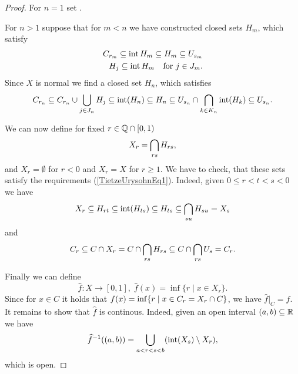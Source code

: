 \begin{proof}
	For $n=1$ set .

	For $n>1$ suppose that for $m<n$ we have constructed closed sets $H_m$, which satisfy
	\begin{align*}
		C_{r_m} \subseteq \operatorname{int} H_m \subseteq H_m \subseteq U_{s_m}\\
		H_j \subseteq \operatorname{int} H_m \hspace{0.7em}\text{ for } j\in J_m.
	\end{align*}
	Since $X$ is normal we find a closed set $H_n$, which satisfies
	\begin{equation*}
		C_{r_n} \subseteq C_{r_n} \cup \bigcup \limits_{j \in J_n}H_j \subseteq \operatorname{int} (H_n) \subseteq H_n \subseteq U_{s_n} \cap \bigcap \limits_{k \in K_n} \operatorname{int} (H_k) \subseteq U_{s_n}.
	\end{equation*}

	We can now define for fixed $r \in \mathbb{Q} \cap [0,1)$
	\begin{equation*}
		X_r = \bigcap \limits_{rs} H_{rs},
	\end{equation*}
	and $X_r = \emptyset$ for $r<0$ and $X_r = X$ for $r \geq 1$. We have to check, that these sets satisfy the requirements (\ref{TietzeUrysohnEq1}). Indeed, given $0 \leq r < t < s < 0$ we have
	\begin{equation*}
		X_r \subseteq H_{rt} \subseteq \operatorname{int}(H_{ts}) \subseteq H_{ts} \subseteq \bigcap \limits_{su} H_{su} = X_s
	\end{equation*}
	and
	\begin{equation*}
		C_r \subseteq C \cap X_r = C \cap \bigcap \limits_{rs} H_{rs} \subseteq C \cap \bigcap \limits_{rs} U_s = C_r.
	\end{equation*}

	Finally we can define 
	\begin{equation*}
		\widehat{f}:X \longrightarrow [0,1],\; \widehat{f}(x) = \inf \{r \mid x \in X_r\}.
	\end{equation*}
	Since for $x \in C$ it holds that $f(x) = \inf \{r \mid x \in C_r = X_r \cap C\}$, we have $\widehat{f}\vert_C = f$. It remains to show that $\widehat{f}$ is continous. Indeed, given an open interval $(a,b) \subseteq \mathbb{R}$ we have
	\begin{equation*}
		\widehat{f}^{-1}((a,b)) = \bigcup \limits_{a<r<s<b}(\operatorname{int}(X_s) \setminus X_r),
	\end{equation*}
	which is open.
\end{proof}

